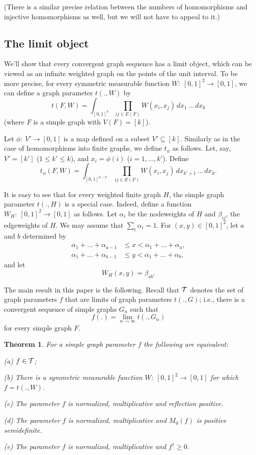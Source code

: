 \documentclass[fleqn]{article}
\newtheorem{theorem}{Theorem}[section]
\begin{document}
(There is a similar precise relation between the numbers of
homomorphisms and injective homomorphisms as well, but we will not
have to appeal to it.)

\subsection{The limit object}

We'll show that every convergent graph sequence has a limit object,
which can be viewed as an infinite weighted graph on the points of
the unit interval. To be more precise, for every symmetric measurable
function $W:~[0,1]^2\to[0,1]$, we can define a graph parameter
$t(.,W)$ by
\[
t(F,W)=\int_{[0,1]^k} \prod_{ij\in E(F)}
W(x_i,x_j)\,dx_1\,\dots\,dx_k
\]
(where $F$ is a simple graph with $V(F)=[k]$).

Let $\phi:~V'\to [0,1]$ is a map defined on a subset $V'\subseteq
[k]$. Similarly as in the case of homomorphisms into finite graphs,
we define $t_\phi$ as follows. Let, say, $V'=[k']$ ($1\le k'\le k$),
and $x_i=\phi(i)$ ($i=1,\dots,k'$). Define
\[
t_\phi(F,W)=\int_{[0,1]^{k-k'}} \prod_{ij\in E(F)}
W(x_i,x_j)\,dx_{k'+1}\,\dots\,dx_k.
\]

It is easy to see that for every weighted finite graph $H$, the
simple graph parameter $t(.,H)$ is a special case. Indeed, define a
function $W_H:~[0,1]^2\to[0,1]$ as follows. Let $\alpha_i$ be the
nodeweights of $H$ and $\beta_{ij}$, the edgeweights of $H$. We may
assume that $\sum_i\alpha_i=1$. For $(x,y)\in[0,1]^2$, let $a$ and
$b$ determined by
\begin{align*}
\alpha_1+\dots+\alpha_{a-1} &\le x <\alpha_1+\dots+\alpha_a,\\
\alpha_1+\dots+\alpha_{b-1} &\le y <\alpha_1+\dots+\alpha_b,
\end{align*}
and let
\[
W_H(x,y)=\beta_{ab}.
\]

The main result in this paper is the following. Recall that ${\cal T}$
denotes the set of graph parameters $f$ that are limits of graph
parameters $t(.,G)$; i.e., there is a convergent sequence of simple
graphs $G_n$ such that
\[
f(.)=\lim_{n\to\infty} t(.,G_n)
\]
for every simple graph $F$.

\begin{theorem}\label{MAIN}
For a simple graph parameter $f$ the following are equivalent:

\smallskip

{\rm (a)} $f\in{\cal T}$;

\smallskip

{\rm (b)} There is a symmetric measurable function
$W:~[0,1]^2\to[0,1]$ for which $f=t(.,W)$.

\smallskip

{\rm (c)} The parameter $f$ is normalized, multiplicative and
reflection positive.

\smallskip

{\rm (d)} The parameter $f$ is normalized, multiplicative and
$M_0(f)$ is positive semidefinite.

\smallskip

{\rm (e)} The parameter $f$ is normalized, multiplicative and
$f^{\dagger}\ge 0$.
\end{theorem}
\end{document}
